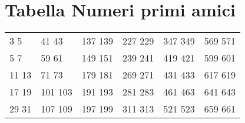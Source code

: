 \section{Tabella Numeri primi amici}
\label{sec:TabellaNumeriPrimiAmici}
\begin{center}
\footnotesize
\begin{longtable}{llllll}
3 5&41 43&137 139&227 229&347 349&569 571\\
5 7&59 61&149 151&239 241&419 421&599 601\\
11 13&71 73&179 181&269 271&431 433&617 619\\
17 19&101 103&191 193&281 283&461 463&641 643\\
29 31&107 109&197 199&311 313&521 523&659 661\\
\end{longtable}
\end{center}

